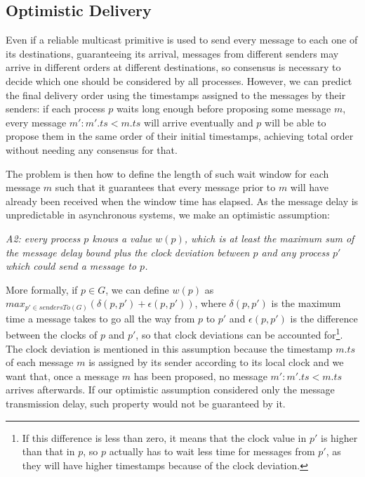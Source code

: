 \documentclass[times, 10pt]{article}
\begin{document}
\subsection{Optimistic Delivery}
\label{sec:optdel}

Even if a reliable multicast primitive is used to send every message to each one of its destinations, guaranteeing its arrival, messages from different senders may arrive in different orders at different destinations, so consensus is necessary to decide which one should be considered by all processes. However, we can predict the final delivery order using the timestamps assigned to the messages by their senders: if each process $p$ waits long enough before proposing some message $m$, every message $m' : m'.ts < m.ts$ will arrive eventually and $p$ will be able to propose them in the same order of their initial timestamps, achieving total order without needing any consensus for that.

The problem is then how to define the length of such wait window for each message $m$ such that it guarantees that every message prior to $m$ will have already been received when the window time has elapsed. As the message delay is unpredictable in asynchronous systems, we make an optimistic assumption:

\begin{center}
\emph{A2: every process $p$ knows a value $w(p)$, which is at least the maximum sum of the message delay bound plus the clock deviation between $p$ and any process $p'$ which could send a message to $p$.}
\end{center}

More formally, if $p \in G$, we can define $w(p)$ as $max_{p' \in sendersTo(G)}(\delta(p,p')+\epsilon(p,p'))$, where $\delta(p,p')$ is the maximum time a message takes to go all the way from $p$ to $p'$ and $\epsilon(p,p')$ is the difference between the clocks of $p$ and $p'$, so that clock deviations can be accounted for\footnote{If this difference is less than zero, it means that the clock value in $p'$ is higher than that in $p$, so $p$ actually has to wait less time for messages from $p'$, as they will have higher timestamps because of the clock deviation.}. The clock deviation is mentioned in this assumption because the timestamp $m.ts$ of each message $m$ is assigned by its sender according to its local clock and we want that, once a message $m$ has been proposed, no message $m' : m'.ts < m.ts$ arrives afterwards. If our optimistic assumption considered only the message transmission delay, such property would not be guaranteed by it.
\end{document}
